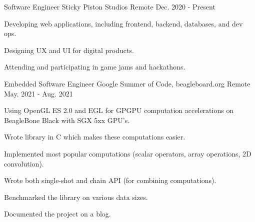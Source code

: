 \begin{cventries}
	\cventry
		{Software Engineer} %
		{Sticky Piston Studios} %
		{Remote} %
		{Dec. 2020 - Present} %
		{
			\begin{cvitems}
				\item {Developing web applications, including frontend, backend, databases, and dev ops.}
				\item {Designing UX and UI for digital products.}
				\item {Attending and participating in game jams and hackathons.}
			\end{cvitems}
		}

  \cventry
    {Embedded Software Engineer} %
    {Google Summer of Code, beagleboard.org} %
    {Remote} %
    {May. 2021 - Aug. 2021} %
    {
      \begin{cvitems} %
          \item { Using OpenGL ES 2.0 and EGL for GPGPU computation accelerations on BeagleBone Black with SGX 5xx GPU's.}
          \item { Wrote library in C which makes these computations easier. }
          \item { Implemented most popular computations (scalar operators, array operations, 2D convolution). }
          \item { Wrote both single-shot and chain API (for combining computations). }
          \item { Benchmarked the library on various data sizes. }
          \item { Documented the project on a blog.}
      \end{cvitems}
    }


\end{cventries}
